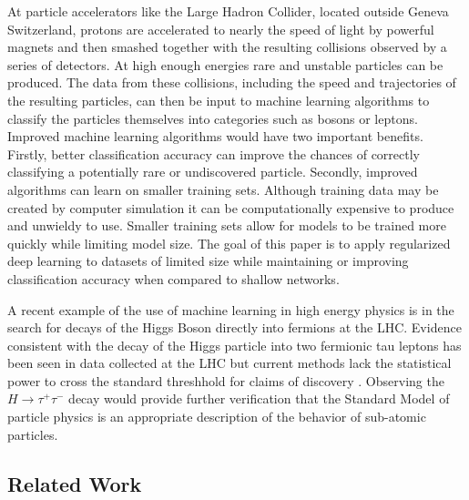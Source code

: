 \documentclass[12pt,letterpaper]{article}
\begin{document}
At particle accelerators like the Large Hadron Collider, located outside Geneva Switzerland, protons are accelerated to nearly the speed of light by powerful magnets and then smashed together with the resulting collisions observed by a series of detectors.  At high enough energies rare and unstable particles can be produced.  The data from these collisions, including the speed and trajectories of the resulting particles, can then be input to machine learning algorithms to classify the particles themselves into categories such as bosons or leptons.  Improved machine learning algorithms would have two important benefits.  Firstly, better classification accuracy can improve the chances of correctly classifying a potentially rare or undiscovered particle.  Secondly, improved algorithms can learn on smaller training sets.  Although training data may be created by computer simulation it can be computationally expensive to produce and unwieldy to use.  Smaller training sets allow for models to be trained more quickly while limiting model size.  The goal of this paper is to apply regularized deep learning to datasets of limited size while maintaining or improving classification accuracy when compared to shallow networks.

A recent example of the use of machine learning in high energy physics is in the search for decays of the Higgs Boson directly into fermions at the LHC.  Evidence consistent with the decay of the Higgs particle into two fermionic tau leptons has been seen in data collected at the LHC but current methods lack the statistical power to cross the standard threshhold for claims of discovery \cite{pmlr-v42-cowa14}.  Observing the $H \rightarrow \tau^+ \tau^-$ decay would provide further verification that the Standard Model of particle physics is an appropriate description of the behavior of sub-atomic particles.

\subsection{Related Work}
\end{document}
